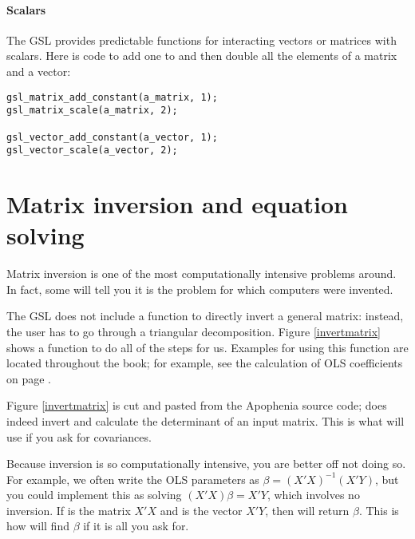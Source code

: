 
\paragraph{Scalars} The GSL provides predictable functions for
interacting vectors or matrices with scalars. Here is code to add one to
and then double all the elements of a matrix and a vector:
\begin{lstlisting}
gsl_matrix_add_constant(a_matrix, 1);
gsl_matrix_scale(a_matrix, 2);

gsl_vector_add_constant(a_vector, 1);
gsl_vector_scale(a_vector, 2);
\end{lstlisting}
 
 

\section{Matrix inversion and equation solving}  
Matrix inversion is one of the most computationally intensive problems
around. In fact, some will tell you it is the problem for which computers were invented.


The GSL does not include a function to directly invert a general matrix:
instead, the user has to go through a triangular decomposition. Figure
\ref{invertmatrix} shows a function to do all of the steps for us.
Examples for using this function are located throughout the book; for
example, see the calculation of OLS coefficients on page \pageref{ols}.

Figure \ref{invertmatrix} is cut and pasted from the Apophenia source
code;  does indeed invert and calculate the
determinant of an input matrix. This is what  will use if
you ask for covariances.

Because inversion is so computationally intensive, you are better off
not doing so.  For example, we often write the OLS parameters as $\beta
=(X'X)^{-1}(X'Y)$, but you could implement this as solving
$(X'X)\beta = X'Y$, which involves no inversion. If  is the
matrix $X'X$ and  is the vector $X'Y$, then 
 will
return $\beta$. This is how  will find $\beta$ if it
is all you ask for.

